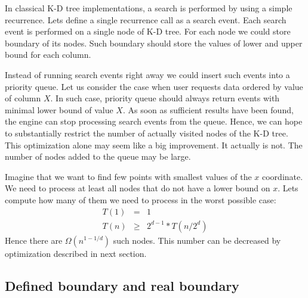 \documentclass[10pt,a4paper]{article}
\begin{document}
In classical K-D tree implementations, a search is performed by using a simple recurrence. Lets define a single recurrence call as a search event. Each search event is performed on a single node of K-D tree. For each node we could store boundary of its nodes. Such boundary should store the values of lower and upper bound for each column.

Instead of running search events right away we could insert such events into a priority queue. Let us consider the case when user requests data ordered by value of column $X$. In such case, priority queue should always return events with minimal lower bound of value $X$. As soon as sufficient results have been found, the engine can stop processing search events from the queue. Hence, we can hope to substantially restrict the number of actually visited nodes of the K-D tree. This optimization alone may seem like a big improvement. It actually is not. The number of nodes added to the queue may be large.

Imagine that we want to find few points with smallest values of the $x$ coordinate. We need to process at least all nodes
that do not have a lower bound on $x$. Lets compute how many of them we need to process in the worst possible case:
\begin{eqnarray*}
T(1) &=& 1\\
T(n) &\geq& 2^{d-1} * T(n/2^{d})
\end{eqnarray*}
Hence there are $\Omega (n^{1-1/d})$ such nodes. This number can be decreased by optimization described in next section.

\subsection{Defined boundary and real boundary}
\end{document}
